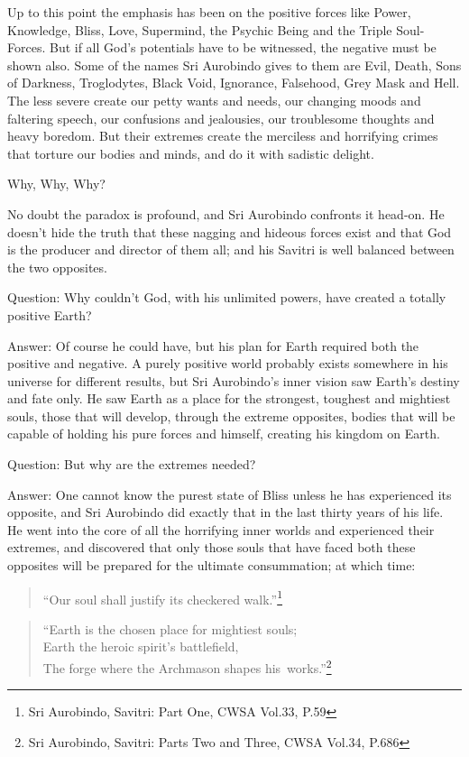 \documentclass[12pt,a4paper]{book}
\begin{document}
Up to this point the emphasis has been on the positive forces like
Power, Knowledge, Bliss, Love, Supermind, the Psychic Being and the
Triple Soul-Forces. But if all God's potentials have to be witnessed,
the negative must be shown also. Some of the names Sri Aurobindo gives
to them are Evil, Death, Sons of Darkness, Troglodytes, Black Void,
Ignorance, Falsehood, Grey Mask and Hell. The less severe create our
petty wants and needs, our changing moods and faltering speech, our
confusions and jealousies, our troublesome thoughts and heavy boredom.
But their extremes create the merciless and horrifying crimes that
torture our bodies and minds, and do it with sadistic delight.

\noindent Why, Why, Why?

No doubt the paradox is profound, and Sri Aurobindo confronts it
head-on. He doesn't hide the truth that these nagging and hideous
forces exist and that God is the producer and director of them all;
and his Savitri is well balanced between the two opposites.

Question: Why couldn't God, with his unlimited powers, have created a
totally positive Earth?

Answer: Of course he could have, but his plan for Earth required both
the positive and negative. A purely positive world probably exists
somewhere in his universe for different results, but Sri Aurobindo's
inner vision saw Earth's destiny and fate only. He saw Earth as a
place for the strongest, toughest and mightiest souls, those that will
develop, through the extreme opposites, bodies that will be capable of
holding his pure forces and himself, creating his kingdom on Earth.

Question: But why are the extremes needed?

Answer: One cannot know the purest state of Bliss unless he has
experienced its opposite, and Sri Aurobindo did exactly that in the
last thirty years of his life. He went into the core of all the
horrifying inner worlds and experienced their extremes, and discovered
that only those souls that have faced both these opposites will be
prepared for the ultimate consummation; at which time:

\begin{verse}
``Our soul shall justify its checkered walk.''\footnote{Sri Aurobindo, Savitri: Part One, CWSA Vol.33, P.59}
\end{verse}

\begin{verse}
``Earth is the chosen place for mightiest souls;\\ Earth the heroic
  spirit's battlefield,\\ The forge where the Archmason shapes his~works.''\footnote{Sri Aurobindo, Savitri: Parts Two and Three, CWSA
    Vol.34, P.686}
\end{verse}
\end{document}
